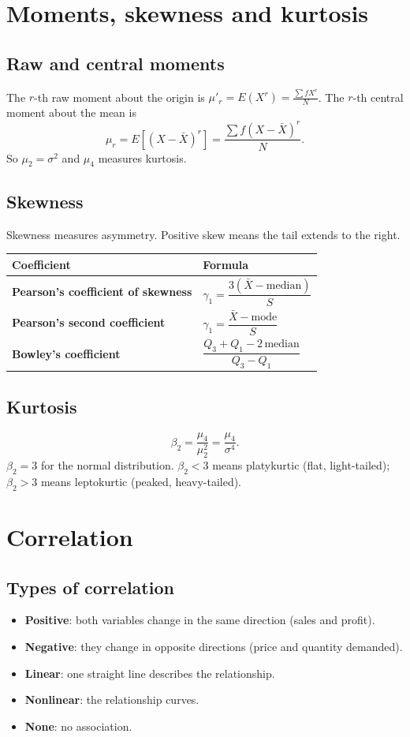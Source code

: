 \documentclass[11pt,a4paper]{article}
\begin{document}
\section{Moments, skewness and kurtosis}

\subsection{Raw and central moments}
The $r$-th raw moment about the origin is $\mu'_r=E(X^r)=\frac{\sum fX^r}{N}$. The $r$-th central moment about the mean is
\[
\mu_r=E[(X-\bar X)^r]=\frac{\sum f(X-\bar X)^r}{N}.
\]
So $\mu_2=\sigma^2$ and $\mu_4$ measures kurtosis.

\subsection{Skewness}
Skewness measures asymmetry. Positive skew means the tail extends to the right.

\begin{center}\small
\begin{tabularx}{\textwidth}{>{\bfseries}p{} X}
\toprule Coefficient & Formula\\\midrule
Pearson's coefficient of skewness & $\gamma_1=\dfrac{3(\bar X-\text{median})}{S}$\\
Pearson's second coefficient & $\gamma_1=\dfrac{\bar X-\text{mode}}{S}$\\
Bowley's coefficient & $\dfrac{Q_3+Q_1-2\,\text{median}}{Q_3-Q_1}$\\\bottomrule
\end{tabularx}
\end{center}

\subsection{Kurtosis}
\[
\beta_2=\frac{\mu_4}{\mu_2^2}=\frac{\mu_4}{\sigma^4}.
\]
$\beta_2=3$ for the normal distribution. $\beta_2<3$ means platykurtic (flat, light-tailed); $\beta_2>3$ means leptokurtic (peaked, heavy-tailed).

\section{Correlation}

\subsection{Types of correlation}
\begin{itemize}
\item \textbf{Positive}: both variables change in the same direction (sales and profit).
\item \textbf{Negative}: they change in opposite directions (price and quantity demanded).
\item \textbf{Linear}: one straight line describes the relationship.
\item \textbf{Nonlinear}: the relationship curves.
\item \textbf{None}: no association.
\end{itemize}
\end{document}
